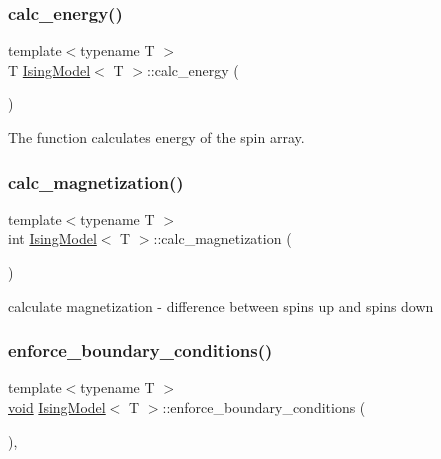 \subsubsection{\texorpdfstring{calc\+\_\+energy()}{calc\_energy()}}
{\footnotesize\ttfamily template$<$typename T $>$ \\
T \mbox{\hyperlink{classIsingModel}{Ising\+Model}}$<$ T $>$\+::calc\+\_\+energy (\begin{DoxyParamCaption}{ }\end{DoxyParamCaption})\hspace{0.3cm}{\ttfamily [inline]}}



The function calculates energy of the spin array. 

\mbox{\label{classIsingModel_a349a13b847fb221eec7043fc53649640}} 
\subsubsection{\texorpdfstring{calc\+\_\+magnetization()}{calc\_magnetization()}}
{\footnotesize\ttfamily template$<$typename T $>$ \\
int \mbox{\hyperlink{classIsingModel}{Ising\+Model}}$<$ T $>$\+::calc\+\_\+magnetization (\begin{DoxyParamCaption}{ }\end{DoxyParamCaption})\hspace{0.3cm}{\ttfamily [inline]}}



calculate magnetization -\/ difference between spins up and spins down 

\mbox{\label{classIsingModel_abe2a720ca3ed7dde191e36fbf33561b3}} 
\subsubsection{\texorpdfstring{enforce\+\_\+boundary\+\_\+conditions()}{enforce\_boundary\_conditions()}}
{\footnotesize\ttfamily template$<$typename T $>$ \\
\mbox{\hyperlink{glad_8h_a950fc91edb4504f62f1c577bf4727c29}{void}} \mbox{\hyperlink{classIsingModel}{Ising\+Model}}$<$ T $>$\+::enforce\+\_\+boundary\+\_\+conditions (\begin{DoxyParamCaption}{ }\end{DoxyParamCaption})\hspace{0.3cm}{\ttfamily [inline]}, {\ttfamily [private]}}



